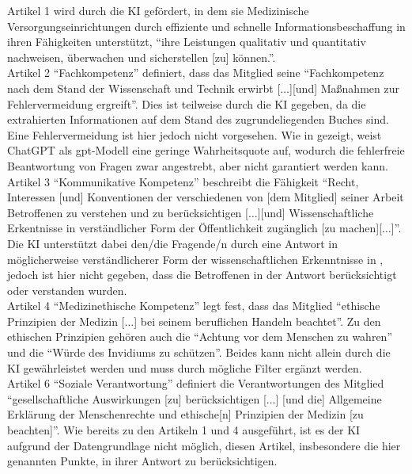 Artikel 1 wird durch die KI gefördert, in dem sie Medizinische Versorgungseinrichtungen durch effiziente und schnelle Informationsbeschaffung in ihren Fähigkeiten unterstützt, 
\enquote{ihre Leistungen qualitativ und quantitativ nachweisen, überwachen und sicherstellen [zu] können.}.\\

Artikel 2 \enquote{Fachkompetenz} definiert, dass das Mitglied seine \enquote{Fachkompetenz nach dem Stand der Wissenschaft und Technik erwirbt [$\dots$][und] Maßnahmen zur Fehlervermeidung ergreift}. 
Dies ist teilweise durch die KI gegeben, da die extrahierten Informationen auf dem Stand des zugrundeliegenden Buches \citet{bb} sind. 
Eine Fehlervermeidung ist hier jedoch nicht vorgesehen. 
Wie in \citet{chatgpt_qas} gezeigt, weist ChatGPT als \ac{gpt}-Modell eine geringe Wahrheitsquote auf, 
wodurch die fehlerfreie Beantwortung von Fragen zwar angestrebt, aber nicht garantiert werden kann.\\

Artikel 3 \enquote{Kommunikative Kompetenz} beschreibt die Fähigkeit 
\enquote{Recht, Interessen [und] Konventionen der verschiedenen von [dem Mitglied] seiner Arbeit Betroffenen zu verstehen und zu berücksichtigen [$\dots$][und]
Wissenschaftliche Erkentnisse in verständlicher Form der Öffentlichkeit zugänglich [zu machen][$\dots$]}.
Die KI unterstützt dabei den/die Fragende/n durch eine Antwort in möglicherweise verständlicherer Form der wissenschaftlichen Erkenntnisse in \citet{bb}, 
jedoch ist hier nicht gegeben, dass die Betroffenen in der Antwort berücksichtigt oder verstanden wurden.\\

Artikel 4 \enquote{Medizinethische Kompetenz} legt fest, dass das Mitglied 
\enquote{ethische Prinzipien der Medizin [$\dots$] bei seinem beruflichen Handeln beachtet}.
Zu den ethischen Prinzipien gehören auch die \enquote{Achtung vor dem Menschen zu wahren} und die \enquote{Würde des Invidiums zu schützen}.
Beides kann nicht allein durch die KI gewährleistet werden und muss durch mögliche Filter ergänzt werden.\\

Artikel 6 \enquote{Soziale Verantwortung} definiert die Verantwortungen des Mitglied 
\enquote{gesellschaftliche Auswirkungen [zu] berücksichtigen [$\dots$] [und die] Allgemeine Erklärung der Menschenrechte und ethische[n] Prinzipien der Medizin [zu beachten]}. 
Wie bereits zu den Artikeln 1 und 4 ausgeführt, ist es der KI aufgrund der Datengrundlage nicht möglich, diesen Artikel, insbesondere die hier genannten Punkte, in ihrer Antwort zu berücksichtigen.\\

